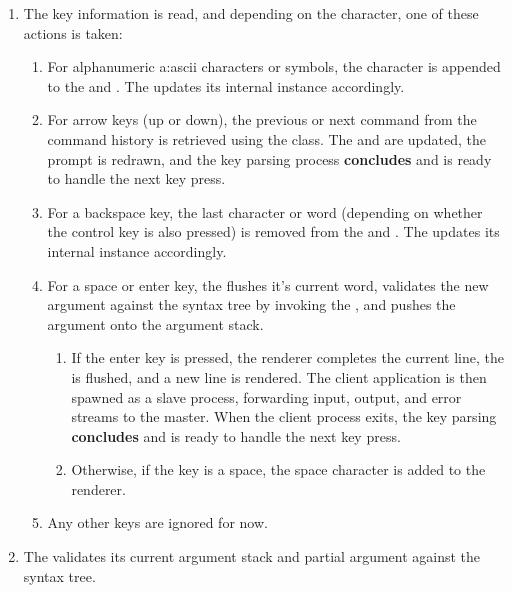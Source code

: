 \begin{enumerate}
    \item The key information is read, and depending on the character, one of these actions is taken:
    \begin {enumerate}
        \item For alphanumeric \gls{a:ascii} characters or symbols, the character is appended to the  and . The  updates its internal  instance accordingly.
        \item For arrow keys (up or down), the previous or next command from the command history is retrieved using the  class. The  and  are updated, the prompt is redrawn, and the key parsing process \textbf{concludes} and is ready to handle the next key press.
        \item For a backspace key, the last character or word (depending on whether the control key is also pressed) is removed from the  and . The  updates its internal  instance accordingly.
        \item For a space or enter key, the  flushes it's current word, validates the new argument against the syntax tree by invoking the , and pushes the argument onto the argument stack.
        \begin{enumerate}
            \item If the enter key is pressed, the renderer completes the current line, the  is flushed, and a new line is rendered. The client application is then spawned as a slave process, forwarding input, output, and error streams to the master. When the client process exits, the key parsing \textbf{concludes} and is ready to handle the next key press.
            \item Otherwise, if the key is a space, the space character is added to the renderer.
        \end{enumerate}
        \item Any other keys are ignored for now.
    \end{enumerate}
    \item The  validates its current argument stack and partial argument against the syntax tree.

\end{enumerate}
